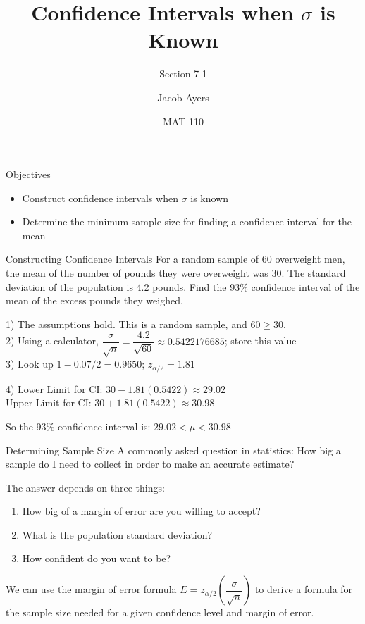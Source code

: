 \documentclass[t, aspectratio=169]{beamer}
\title[7-1b]{Confidence Intervals when $\sigma$ is Known}
\subtitle{Section 7-1}
\author{Jacob Ayers}
\institute{Lesson \#21}
\date{MAT 110}
\newcommand{\fp}[1]{\left({#1}\right)} %
\newcommand{\?}{\stackrel{?}{=}}
\begin{document}
	
	\begin{frame}
		\titlepage
	\end{frame}
	
	\begin{frame}{Objectives}
		\begin{itemize}
			\item Construct confidence intervals when $\sigma$ is known
			\item Determine the minimum sample size for finding a confidence interval for the mean
		\end{itemize}
	\end{frame}

	\begin{frame}{Constructing Confidence Intervals}
		For a random sample of 60 overweight men, the mean of the number of pounds they were overweight was 30. The standard deviation of the population is 4.2 pounds. Find the 93\% confidence interval of the mean of the excess pounds they weighed. \pause
		
		1) The assumptions hold. This is a random sample, and $60 \geq 30$. \pause \\
		2) Using a calculator, $\dfrac{\sigma}{\sqrt{n}} = \dfrac{4.2}{\sqrt{60}} \approx 0.5422176685$; store this value \pause \\
		3) Look up $1 - 0.07/2 = 0.9650$\pause; $z_{\alpha/2} = 1.81$ \pause
		
		4) Lower Limit for CI: $30 - 1.81(0.5422) \approx 29.02$ \pause \\
		Upper Limit for CI: $30 + 1.81(0.5422) \approx 30.98$ \pause
		
		So the 93\% confidence interval is: $29.02 < \mu < 30.98$
	\end{frame}
	
	\begin{frame}{Determining Sample Size}
		A commonly asked question in statistics: How big a sample do I need to collect in order to make an accurate estimate? \pause
		
		The answer depends on three things: \begin{enumerate}[1)]
			\item How big of a margin of error are you willing to accept? \pause
			\item What is the population standard deviation? \pause
			\item How confident do you want to be? \pause
		\end{enumerate}
		
		We can use the margin of error formula $E = z_{\alpha / 2}\fp{\dfrac{\sigma}{\sqrt{n}}}$ to derive a formula for the sample size needed for a given confidence level and margin of error.
	\end{frame}
	
\end{document}
